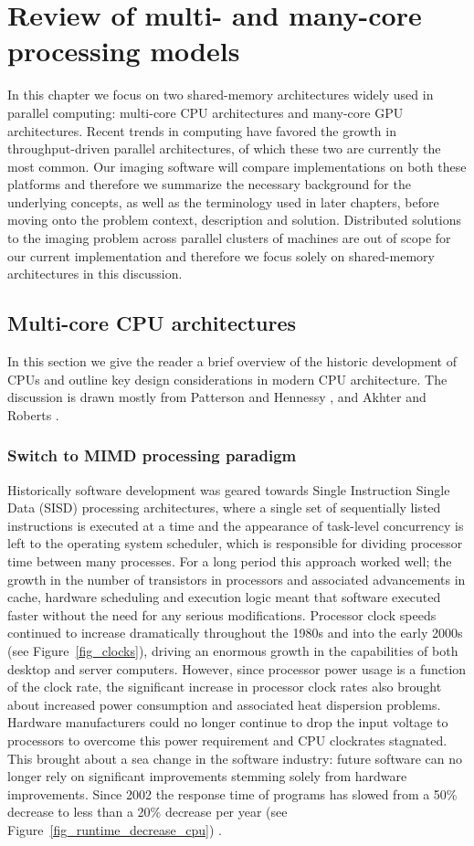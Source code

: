 \chapter{Review of multi- and many-core processing models}
\label{ch_2}
In this chapter we focus on two shared-memory architectures widely used in parallel computing: multi-core CPU architectures and many-core GPU architectures. Recent trends in computing
have favored the growth in throughput-driven parallel architectures, of which these two are currently the most common. Our imaging software will compare implementations on both these platforms and
therefore we summarize the necessary background for the underlying concepts, as well as the terminology used in later chapters, before moving onto the problem context, description and solution. Distributed 
solutions to the imaging problem across parallel clusters of machines are out of scope for our current implementation and therefore we focus solely on shared-memory architectures in this discussion.
\section{Multi-core CPU architectures}
In this section we give the reader a brief overview of the historic development of CPUs and outline key design considerations in modern CPU architecture. The discussion is drawn mostly from 
Patterson and Hennessy \cite[ch. 1, 4, 5 and 7]{patterson2009computer}, and Akhter and Roberts \cite[ch. 1, 3 and 6]{akhter2006multi}.
\subsection{Switch to MIMD processing paradigm}
Historically software development was geared towards Single Instruction Single Data (SISD) processing architectures, where a single set of sequentially listed instructions is 
executed at a time and the appearance of task-level concurrency is left to the operating system scheduler, which is responsible for dividing processor time between many processes. 
For a long period this approach worked well; the growth in the number of transistors in processors and associated 
advancements in cache, hardware scheduling and execution logic meant that software executed faster without the need for any serious modifications. Processor clock
speeds continued to increase dramatically throughout the 1980s and into the early 2000s (see Figure~\ref{fig_clocks}), driving an enormous growth in the capabilities of both
desktop and server computers. However, since processor power usage is a function of the clock rate, the significant increase in processor clock rates 
also brought about increased power consumption and associated heat dispersion problems. Hardware manufacturers could no longer continue to drop the input 
voltage to processors to overcome this power requirement and CPU clockrates stagnated. This brought about a sea change in the software industry: 
future software can no longer rely on significant improvements stemming solely from hardware improvements. Since 2002 the response time of programs has slowed 
from a 50\% decrease to less than a 20\% decrease per year (see Figure~\ref{fig_runtime_decrease_cpu}) \cite{patterson2009computer}.

